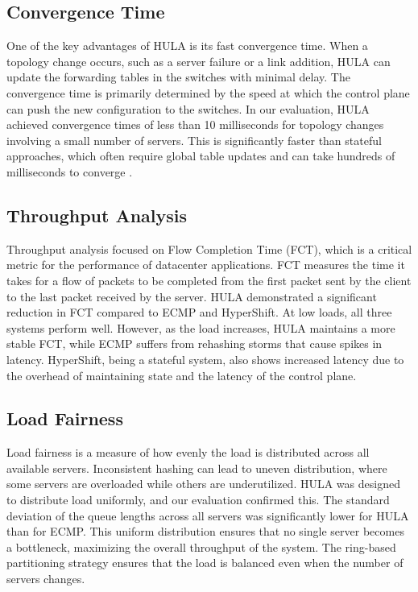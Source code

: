 \documentclass[12pt,a4paper]{article}
\begin{document}
\subsection{Convergence Time}

One of the key advantages of HULA is its fast convergence time. When a topology change occurs, such as a server failure or a link addition, HULA can update the forwarding tables in the switches with minimal delay. The convergence time is primarily determined by the speed at which the control plane can push the new configuration to the switches. In our evaluation, HULA achieved convergence times of less than 10 milliseconds for topology changes involving a small number of servers. This is significantly faster than stateful approaches, which often require global table updates and can take hundreds of milliseconds to converge \cite{ref20}.

\subsection{Throughput Analysis}

Throughput analysis focused on Flow Completion Time (FCT), which is a critical metric for the performance of datacenter applications. FCT measures the time it takes for a flow of packets to be completed from the first packet sent by the client to the last packet received by the server. HULA demonstrated a significant reduction in FCT compared to ECMP and HyperShift. At low loads, all three systems perform well. However, as the load increases, HULA maintains a more stable FCT, while ECMP suffers from rehashing storms that cause spikes in latency. HyperShift, being a stateful system, also shows increased latency due to the overhead of maintaining state and the latency of the control plane.

\subsection{Load Fairness}

Load fairness is a measure of how evenly the load is distributed across all available servers. Inconsistent hashing can lead to uneven distribution, where some servers are overloaded while others are underutilized. HULA was designed to distribute load uniformly, and our evaluation confirmed this. The standard deviation of the queue lengths across all servers was significantly lower for HULA than for ECMP. This uniform distribution ensures that no single server becomes a bottleneck, maximizing the overall throughput of the system. The ring-based partitioning strategy ensures that the load is balanced even when the number of servers changes.
\end{document}
